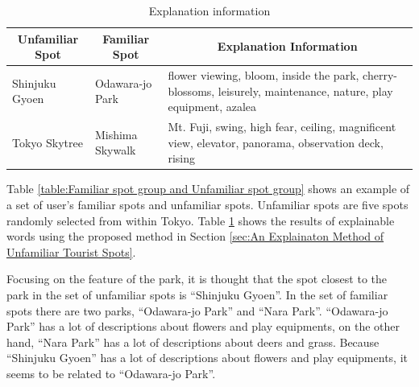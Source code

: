 \documentclass[journal]{IAENGtran}
\begin{document}
\begin{table}[t]
  \caption{Explanation information}
  \label{table:Explanation information}
  \centering
  \begin{tabular}{l|l|l}
  \hline
  \multicolumn{1}{c|}{Unfamiliar Spot} & \multicolumn{1}{c|}{Familiar Spot} & \multicolumn{1}{c}{Explanation Information}                     \\ \hline
  Shinjuku Gyoen                      & Odawara-jo Park                         & flower viewing, bloom, inside the park, cherry-blossoms, leisurely, maintenance, nature, play equipment, azalea          \\
  Tokyo Skytree                     & Mishima Skywalk                    & Mt. Fuji, swing, high fear, ceiling, magnificent view, elevator, panorama, observation deck, rising
 \\ \hline
  \end{tabular}
\end{table}

Table \ref{table:Familiar spot group and Unfamiliar spot group} shows an example of a set of user's familiar spots and unfamiliar spots.
Unfamiliar spots are five spots randomly selected from within Tokyo.
Table \ref{table:Explanation information} shows the results of explainable words using the proposed method in Section \ref{sec:An Explainaton Method of Unfamiliar Tourist Spots}.

Focusing on the feature of the park, it is thought that the spot closest to the park in the set of unfamiliar spots is ``Shinjuku Gyoen''.
In the set of familiar spots there are two parks, ``Odawara-jo Park'' and ``Nara Park''.
``Odawara-jo Park'' has a lot of descriptions about flowers and play equipments, on the other hand, ``Nara Park'' has a lot of descriptions about deers and grass.
Because ``Shinjuku Gyoen'' has a lot of descriptions about flowers and play equipments, it seems to be related to ``Odawara-jo Park''.
\end{document}
